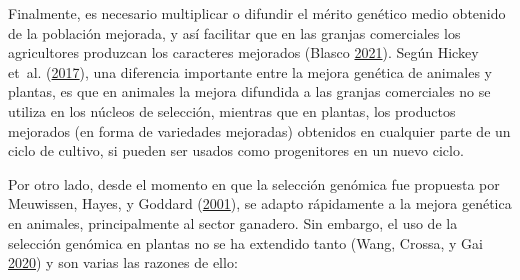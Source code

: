 \documentclass[11pt,spanish,a4paper,oneside,]{book} %
\begin{document}
Finalmente, es necesario multiplicar o difundir el mérito genético medio obtenido de la población mejorada, y así facilitar que en las granjas comerciales los agricultores produzcan los caracteres mejorados (Blasco \protect\hyperlink{ref-cite:21}{2021}). Según Hickey et~al. (\protect\hyperlink{ref-cite:44}{2017}), una diferencia importante entre la mejora genética de animales y plantas, es que en animales la mejora difundida a las granjas comerciales no se utiliza en los núcleos de selección, mientras que en plantas, los productos mejorados (en forma de variedades mejoradas) obtenidos en cualquier parte de un ciclo de cultivo, si pueden ser usados como progenitores en un nuevo ciclo.

Por otro lado, desde el momento en que la selección genómica fue propuesta por Meuwissen, Hayes, y Goddard (\protect\hyperlink{ref-cite:8}{2001}), se adapto rápidamente a la mejora genética en animales, principalmente al sector ganadero. Sin embargo, el uso de la selección genómica en plantas no se ha extendido tanto (Wang, Crossa, y Gai \protect\hyperlink{ref-cite:46}{2020}) y son varias las razones de ello:
\end{document}
